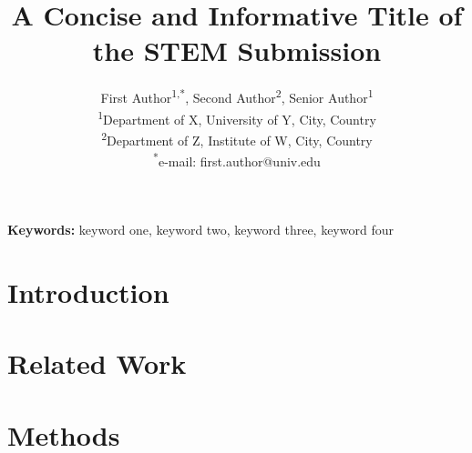 \documentclass[11pt,a4paper]{article}
\title{A Concise and Informative Title of the STEM Submission}
\author{First Author\textsuperscript{1,*}, Second Author\textsuperscript{2}, Senior Author\textsuperscript{1}\\
\textsuperscript{1}Department of X, University of Y, City, Country\\
\textsuperscript{2}Department of Z, Institute of W, City, Country\\
\textsuperscript{*}e-mail: first.author@univ.edu}
\date{}
\begin{document}
\maketitle

\begin{abstract}
\end{abstract}

\noindent\textbf{Keywords:} %
keyword one, keyword two, keyword three, keyword four

\section{Introduction}
\label{sec:intro}

\section{Related Work}
\label{sec:related}

\section{Methods}
\label{sec:methods}
\end{document}

